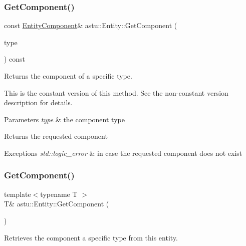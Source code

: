 \subsubsection{\texorpdfstring{Get\+Component()}{GetComponent()}\hspace{0.1cm}{\footnotesize\ttfamily [2/4]}}
{\footnotesize\ttfamily const \hyperlink{classastu_1_1EntityComponent}{Entity\+Component}\& astu\+::\+Entity\+::\+Get\+Component (\begin{DoxyParamCaption}\item[{const std\+::type\+\_\+index \&}]{type }\end{DoxyParamCaption}) const}

Returns the component of a specific type.

This is the constant version of this method. See the non-\/constant version description for details.


\begin{DoxyParams}{Parameters}
{\em type} & the component type \\
\hline
\end{DoxyParams}
\begin{DoxyReturn}{Returns}
the requested component 
\end{DoxyReturn}

\begin{DoxyExceptions}{Exceptions}
{\em std\+::logic\+\_\+error} & in case the requested component does not exist \\
\hline
\end{DoxyExceptions}
\mbox{\label{classastu_1_1Entity_aeabb500a719de29039dd0fad4ea553c4}} 
\subsubsection{\texorpdfstring{Get\+Component()}{GetComponent()}\hspace{0.1cm}{\footnotesize\ttfamily [3/4]}}
{\footnotesize\ttfamily template$<$typename T $>$ \\
T\& astu\+::\+Entity\+::\+Get\+Component (\begin{DoxyParamCaption}{ }\end{DoxyParamCaption})\hspace{0.3cm}{\ttfamily [inline]}}

Retrieves the component a specific type from this entity.

